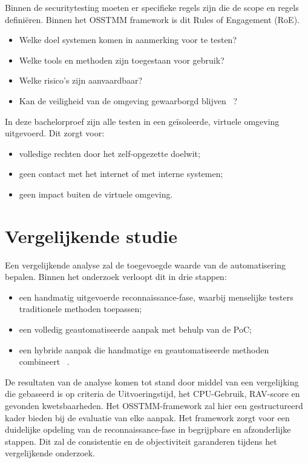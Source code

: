 Binnen de securitytesting moeten er specifieke regels zijn die de scope en regels definiëren. Binnen het OSSTMM framework is dit Rules of Engagement (RoE).

\begin{itemize}
  \item Welke doel systemen komen in aanmerking voor te testen?
  \item Welke tools en methoden zijn toegestaan voor gebruik?
  \item Welke risico's zijn aanvaardbaar? 
  \item Kan de veiligheid van de omgeving gewaarborgd blijven ~\autocite{Herzog}?
\end{itemize}

In deze bachelorproef zijn alle testen in een geïsoleerde, virtuele omgeving uitgevoerd. Dit zorgt voor:

\begin{itemize}
  \item volledige rechten door het zelf-opgezette doelwit;
  \item geen contact met het internet of met interne systemen;
  \item geen impact buiten de virtuele omgeving.
\end{itemize}



\section{Vergelijkende studie}

Een vergelijkende analyse zal de toegevoegde waarde van de automatisering bepalen. Binnen het onderzoek verloopt dit in drie stappen:

\begin{itemize}
    \item een handmatig uitgevoerde reconnaissance-fase, waarbij menselijke testers traditionele methoden toepassen;
    \item een volledig geautomatiseerde aanpak met behulp van de PoC;
    \item een hybride aanpak die handmatige en geautomatiseerde methoden combineert ~\autocite{Herzog}.
\end{itemize}

De resultaten van de analyse komen tot stand door middel van een vergelijking die gebaseerd is op criteria de Uitvoeringstijd, het CPU-Gebruik, RAV-score en gevonden kwetsbaarheden.
Het OSSTMM-framework zal hier een gestructureerd kader bieden bij de evaluatie van elke aanpak. Het framework zorgt voor een duidelijke opdeling van de reconnaissance-fase in begrijpbare en afzonderlijke stappen. Dit zal de consistentie en de objectiviteit garanderen tijdens het vergelijkende onderzoek.





